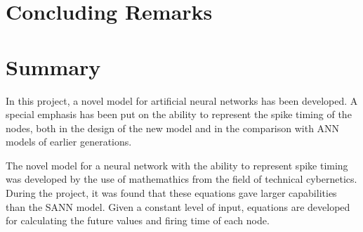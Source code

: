 










\section{Concluding Remarks}



% 
%
\section{Summary}
In this project, a novel model for artificial neural networks has been developed. 
A special emphasis has been put on the ability to represent the spike timing of the nodes, both in the design of the new model and in the comparison with ANN models of earlier generations.


%


The novel model for a neural network with the ability to represent spike timing was developed by the use of mathemathics from the field of technical cybernetics.
During the project, it was found that these equations gave larger capabilities than the SANN model. %
Given a constant level of input, equations are developed for calculating the future values and firing time of each node.

